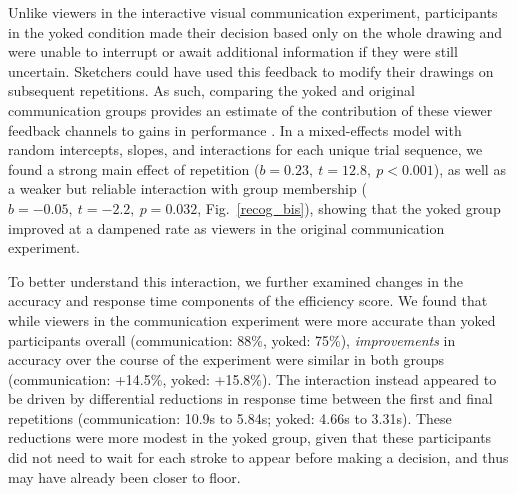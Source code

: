 \documentclass[10pt,letterpaper]{article}
\begin{document}
Unlike viewers in the interactive visual communication experiment, participants in the yoked condition made their decision based only on the whole drawing and were unable to interrupt or await additional information if they were still uncertain.
Sketchers could have used this feedback to modify their drawings on subsequent repetitions.
As such, comparing the yoked and original communication groups provides an estimate of the contribution of these viewer feedback channels to gains in performance \cite{schober_understanding_1989}.
In a mixed-effects model with random intercepts, slopes, and interactions for each unique trial sequence, we found a %
strong main effect of repetition ($b = 0.23, ~t = 12.8,~p < 0.001$), as well as a weaker but reliable interaction with group membership ($b = -0.05, ~t = -2.2, ~p = 0.032$, Fig.~\ref{recog_bis}), showing that the yoked group improved at a dampened rate as viewers in the original communication experiment.

To better understand this interaction, we further examined changes in the accuracy and response time components of the efficiency score.
We found that while viewers in the communication experiment were more accurate than yoked participants overall (communication: 88\%, yoked: 75\%), %
\emph{improvements} in accuracy over the course of the experiment were similar in both groups (communication: +14.5\%, yoked: +15.8\%).
The interaction instead appeared to be driven by differential reductions in response time between the first and final repetitions (communication: 10.9s to 5.84s; yoked: 4.66s to 3.31s).
These reductions were more modest in the yoked group, given that these participants did not need to wait for each stroke to appear before making a decision, and thus may have already been closer to floor.
\end{document}
